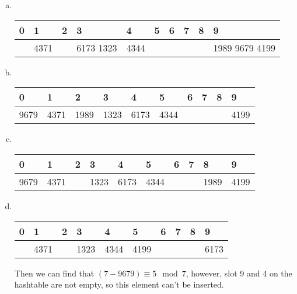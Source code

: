 \documentclass{article}
\begin{document}
\section{}
\begin{enumerate}[(a)]
\item \ 
\begin{center}
\begin{tabular}{|m{2em}<{\centering}|m{2em}<{\centering}|m{2em}<{\centering}|m{2em}<{\centering}|m{2em}<{\centering}|m{2em}<{\centering}|m{2em}<{\centering}|m{2em}<{\centering}|m{2em}<{\centering}|m{2em}<{\centering}|}
\hline
0 & 1 & 2 & 3 & 4 & 5 & 6 & 7 & 8 & 9 \\\hline
& 4371 & & 6173 1323 & 4344 & & & & & 1989 9679 4199 \\\hline
\end{tabular}
\end{center}
\item \ 
\begin{center}
\begin{tabular}{|m{2em}<{\centering}|m{2em}<{\centering}|m{2em}<{\centering}|m{2em}<{\centering}|m{2em}<{\centering}|m{2em}<{\centering}|m{2em}<{\centering}|m{2em}<{\centering}|m{2em}<{\centering}|m{2em}<{\centering}|}
\hline
0 & 1 & 2 & 3 & 4 & 5 & 6 & 7 & 8 & 9 \\\hline
9679 & 4371 & 1989 & 1323 & 6173 & 4344 & & & & 4199 \\\hline
\end{tabular}
\end{center}
\item \ 
\begin{center}
\begin{tabular}{|m{2em}<{\centering}|m{2em}<{\centering}|m{2em}<{\centering}|m{2em}<{\centering}|m{2em}<{\centering}|m{2em}<{\centering}|m{2em}<{\centering}|m{2em}<{\centering}|m{2em}<{\centering}|m{2em}<{\centering}|}
\hline
0 & 1 & 2 & 3 & 4 & 5 & 6 & 7 & 8 & 9 \\\hline
9679 & 4371 & & 1323 & 6173 & 4344 &&& 1989 & 4199 \\\hline
\end{tabular}
\end{center}
\item \ 
\begin{center}
\begin{tabular}{|m{2em}<{\centering}|m{2em}<{\centering}|m{2em}<{\centering}|m{2em}<{\centering}|m{2em}<{\centering}|m{2em}<{\centering}|m{2em}<{\centering}|m{2em}<{\centering}|m{2em}<{\centering}|m{2em}<{\centering}|}
\hline
0 & 1 & 2 & 3 & 4 & 5 & 6 & 7 & 8 & 9 \\\hline
 & 4371 & & 1323 & 4344 & 4199 & & & & 6173 \\\hline
\end{tabular}
\end{center}
Then we can find that $(7-9679)\equiv 5\mod 7$, however, slot 9 and 4 on the hashtable are not empty, so this element can't be inserted.
\end{enumerate}
\end{document}
